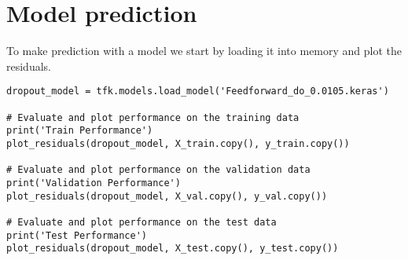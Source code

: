 \section{Model prediction}

To make prediction with a model we start by loading it into memory and plot the residuals.
\begin{lstlisting}[style=Python]
dropout_model = tfk.models.load_model('Feedforward_do_0.0105.keras')

# Evaluate and plot performance on the training data
print('Train Performance')
plot_residuals(dropout_model, X_train.copy(), y_train.copy())

# Evaluate and plot performance on the validation data
print('Validation Performance')
plot_residuals(dropout_model, X_val.copy(), y_val.copy())

# Evaluate and plot performance on the test data
print('Test Performance')
plot_residuals(dropout_model, X_test.copy(), y_test.copy())
\end{lstlisting}